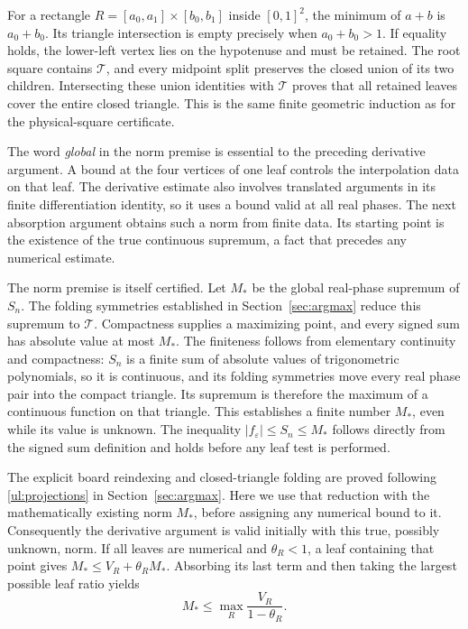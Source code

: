 For a rectangle $R=[a_0,a_1]\times[b_0,b_1]$ inside $[0,1]^2$,
the minimum of $a+b$ is $a_0+b_0$. Its triangle intersection is
empty precisely when $a_0+b_0>1$. If equality holds, the lower-left
vertex lies on the hypotenuse and must be retained. The root square
contains $\mathcal T$, and every midpoint split preserves the closed
union of its two children. Intersecting these union identities with
$\mathcal T$ proves that all retained leaves cover the entire closed
triangle. This is the same finite geometric induction as for the
physical-square certificate.

The word \emph{global} in the norm premise is essential to the
preceding derivative argument. A bound at the four vertices of one
leaf controls the interpolation data on that leaf. The derivative
estimate also involves translated arguments in its finite
differentiation identity, so it uses a bound valid at all real
phases. The next absorption argument obtains such a norm from finite
data. Its starting point is the existence of the true continuous
supremum, a fact that precedes any numerical estimate.

The norm premise is itself certified. Let $M_*$ be the global real-phase
supremum of $S_n$. The folding symmetries established in
Section~\ref{sec:argmax} reduce this supremum to $\mathcal T$.
Compactness supplies a maximizing point, and every signed sum has
absolute value at most $M_*$.
The finiteness follows from elementary continuity and compactness:
$S_n$ is a finite sum of absolute values of trigonometric polynomials,
so it is continuous, and its folding symmetries move every real phase
pair into the compact triangle. Its supremum is therefore the maximum
of a continuous function on that triangle. This establishes a finite
number $M_*$, even while its value is unknown. The inequality
$|f_\varepsilon|\leq S_n\leq M_*$ follows directly from the signed
sum definition and holds before any leaf test is performed.

The explicit board reindexing and closed-triangle folding are proved
following \eqref{ul:projections} in Section~\ref{sec:argmax}. Here we
use that reduction with the mathematically existing norm $M_*$,
before assigning any numerical bound to it.
Consequently the derivative argument is
valid initially with this true, possibly unknown, norm. If all leaves
are numerical and $\theta_R<1$, a leaf containing that point gives
$M_*\leq V_R+\theta_RM_*$. Absorbing its last term and then taking
the largest possible leaf ratio yields
\begin{equation}\label{cert:tree-norm}
 M_*\leq\max_R\frac{V_R}{1-\theta_R}.
\end{equation}

